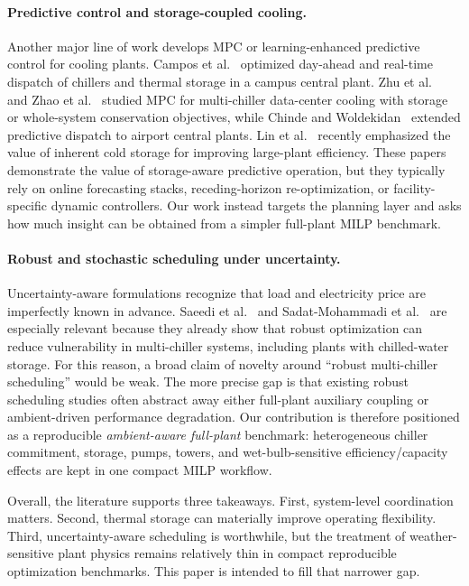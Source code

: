 \paragraph{Predictive control and storage-coupled cooling.}
Another major line of work develops MPC or learning-enhanced predictive control for cooling plants. Campos et al.~\citep{campos2021dispatch} optimized day-ahead and real-time dispatch of chillers and thermal storage in a campus central plant. Zhu et al.~\citep{zhu2023storage} and Zhao et al.~\citep{zhao2024mpc} studied MPC for multi-chiller data-center cooling with storage or whole-system conservation objectives, while Chinde and Woldekidan~\citep{chinde2024airport} extended predictive dispatch to airport central plants. Lin et al.~\citep{lin2025inherent} recently emphasized the value of inherent cold storage for improving large-plant efficiency. These papers demonstrate the value of storage-aware predictive operation, but they typically rely on online forecasting stacks, receding-horizon re-optimization, or facility-specific dynamic controllers. Our work instead targets the planning layer and asks how much insight can be obtained from a simpler full-plant MILP benchmark.

\paragraph{Robust and stochastic scheduling under uncertainty.}
Uncertainty-aware formulations recognize that load and electricity price are imperfectly known in advance. Saeedi et al.~\citep{saeedi2019robust} and Sadat-Mohammadi et al.~\citep{sadatmohammadi2020robust} are especially relevant because they already show that robust optimization can reduce vulnerability in multi-chiller systems, including plants with chilled-water storage. For this reason, a broad claim of novelty around ``robust multi-chiller scheduling'' would be weak. The more precise gap is that existing robust scheduling studies often abstract away either full-plant auxiliary coupling or ambient-driven performance degradation. Our contribution is therefore positioned as a reproducible \emph{ambient-aware full-plant} benchmark: heterogeneous chiller commitment, storage, pumps, towers, and wet-bulb-sensitive efficiency/capacity effects are kept in one compact MILP workflow.

Overall, the literature supports three takeaways. First, system-level coordination matters. Second, thermal storage can materially improve operating flexibility. Third, uncertainty-aware scheduling is worthwhile, but the treatment of weather-sensitive plant physics remains relatively thin in compact reproducible optimization benchmarks. This paper is intended to fill that narrower gap.
